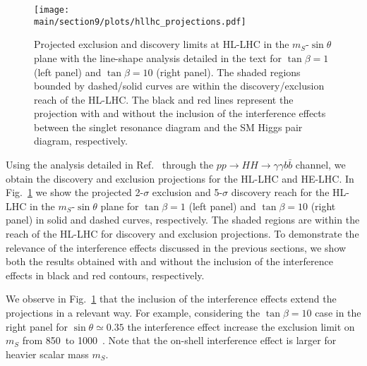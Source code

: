 
\begin{figure}[t]
  \centering
  \texttt{[image: \\main/section9/plots/hllhc\_projections.pdf]}
  \caption{Projected exclusion and discovery limits at HL-LHC in the $m_S$-$\sin\theta$ plane with the line-shape analysis detailed in the text for $\tan\beta=1$ (left panel) and $\tan\beta=10$ (right panel). The shaded regions bounded by dashed/solid curves are within the discovery/exclusion reach of the HL-LHC. The black and red lines represent the projection with and without the inclusion of the interference effects between the singlet resonance diagram and the SM Higgs pair diagram, respectively.
  }
  \label{fig:HLprojection}
\end{figure} 

Using the analysis detailed in Ref.~\cite{Carena:2018vpt} through the $pp\to HH \to \gamma\gamma b\bar b$ channel, we obtain the discovery and exclusion projections for the HL-LHC and HE-LHC.
In Fig.~\ref{fig:HLprojection} we show the projected 2-$\sigma$ exclusion and 5-$\sigma$ discovery reach for the HL-LHC in the $m_S$-$\sin\theta$ plane for $\tan\beta=1$ (left panel) and $\tan\beta=10$ (right panel) in solid and dashed curves, respectively. The shaded regions are within the reach of the HL-LHC for discovery and exclusion projections. To demonstrate the relevance of the interference effects discussed in the previous sections, we show both the results obtained with and without the inclusion of the interference effects in black and red contours, respectively. 

We observe in Fig.~\ref{fig:HLprojection} that the inclusion of the interference effects extend the projections in a relevant way. For example, considering the $\tan\beta=10$ case in the right panel for $\sin\theta\simeq 0.35$ the interference effect increase the exclusion limit on $m_S$ from 850~\UGeV to 1000~\UGeV.
Note that the on-shell interference effect is larger for heavier scalar mass $m_S$. 

